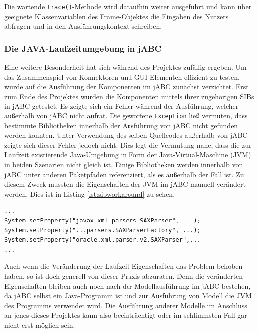 Die wartende \lstinline{trace()}-Methode wird daraufhin weiter ausgeführt und kann über geeignete Klassenvariablen
 des Frame-Objektes die Eingaben des Nutzers abfragen und in den Ausführungskontext schreiben.
\FloatBarrier
\subsubsection{Die JAVA-Laufzeitumgebung in jABC}	
Eine weitere Besonderheit hat sich während des Projektes zufällig ergeben.
Um das Zusammenspiel von Konnektoren und GUI-Elementen effizient zu testen, wurde auf die Ausführung der
 Komponenten im jABC zunächst verzichtet.
Erst zum Ende des Projektes wurden die Komponenten mittels ihrer zugehörigen SIBs in jABC getestet.
Es zeigte sich ein Fehler während der Ausführung, welcher außerhalb von jABC nicht aufrat.
Die geworfene \lstinline{Exception} ließ vermuten, dass bestimmte Bibliotheken innerhalb der Ausführung von jABC nicht
 gefunden werden konnten.
Unter Verwendung des selben Quellcodes außerhalb von jABC zeigte sich dieser Fehler jedoch nicht.
Dies legt die Vermutung nahe, dass die zur Laufzeit existierende Java-Umgebung in Form der Java-Virtual-Maschine (JVM)
 in beiden Szenarien nicht gleich ist.
Einige Bibliotheken werden innerhalb von jABC unter anderen Paketpfaden referenziert, als es außerhalb der Fall ist.
Zu diesem Zweck mussten die Eigenschaften der JVM im jABC manuell verändert werden. Dies ist in Listing \ref{lst:sibworkaround}
 zu sehen.

\begin{lstlisting}[float=h!t]
...
System.setProperty("javax.xml.parsers.SAXParser", ...);
System.setProperty("...parsers.SAXParserFactory", ...);
System.setProperty("oracle.xml.parser.v2.SAXParser",...
...
\end{lstlisting}


Auch wenn die Veränderung der Laufzeit-Eigenschaften das Problem behoben haben, so ist doch generell von dieser Praxis abzuraten.
Denn die veränderten Eigenschaften bleiben auch noch nach der Modellausführung im jABC bestehen, da jABC selbst ein Java-Programm
 ist und zur Ausführung von Modell die JVM des Programms verwendet wird.
Die Ausführung anderer Modelle im Anschluss an jenes dieses Projektes kann also beeinträchtigt oder im schlimmsten Fall gar
 nicht erst möglich sein.
\FloatBarrier